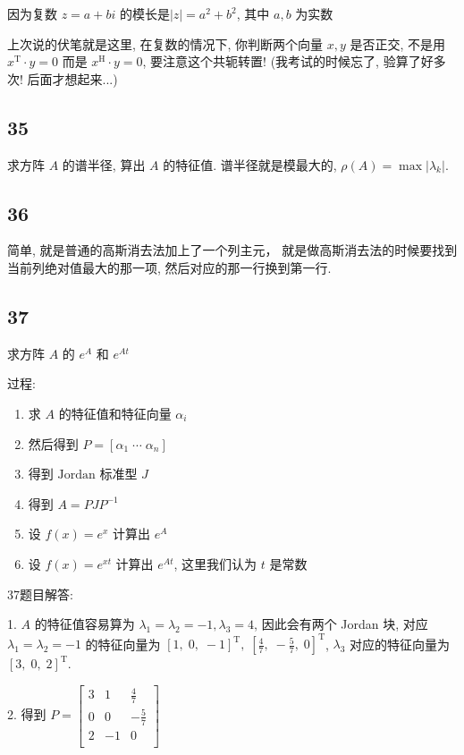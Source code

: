 \documentclass[a4paper, draft]{article}
\begin{document}
因为复数 $z=a+bi$ 的模长是$|z|=a^2+b^2$, 其中 $a,b$ 为实数

上次说的伏笔就是这里, 在复数的情况下, 你判断两个向量 $x,y$ 是否正交, 
不是用 $x^{\text{T}}\cdot y=0$ 而是 $x^{\text{H}}\cdot y=0$, 
要注意这个共轭转置! (我考试的时候忘了, 验算了好多次! 后面才想起来...) 

\subsection*{35}

求方阵 $A$ 的谱半径, 算出 $A$ 的特征值. 谱半径就是模最大的, $\rho(A)=\max |\lambda_k|$.

\subsection*{36}

简单, 就是普通的高斯消去法加上了一个列主元，
就是做高斯消去法的时候要找到当前列绝对值最大的那一项, 
然后对应的那一行换到第一行.

\subsection*{37}


求方阵 $A$ 的 $e^{A}$ 和 $e^{At}$

过程:  

\begin{enumerate}
    \item 求 $A$ 的特征值和特征向量 $\alpha_i$
    \item 然后得到 $P=[\alpha_1\;\cdots\;\alpha_n]$
    \item 得到 $\text{Jordan}$ 标准型 $J$
    \item 得到 $A=PJP^{-1}$
    \item 设 $f(x)=e^{x}$ 计算出 $e^{A}$
    \item 设 $f(x)=e^{xt}$ 计算出 $e^{At}$, 这里我们认为 $t$ 是常数
\end{enumerate}


37题目解答:  

1. $A$ 的特征值容易算为 $\lambda_1=\lambda_2=-1, \lambda_3=4$, 因此会有两个 Jordan 块, 对应 $\lambda_1=\lambda_2=-1$ 的特征向量为 $[1,\;0,\;-1]^{\text{T}},\;[\frac{4}{7},\;-\frac{5}{7},\;0]^{\text{T}}$, $\lambda_3$ 对应的特征向量为 $[3,\;0,\;2]^{\text{T}}$.

2. 得到 $P=\begin{bmatrix}
3&1&\frac{4}{7}\\
0&0&-\frac{5}{7}\\
2&-1&0\\
\end{bmatrix}$
\end{document}
